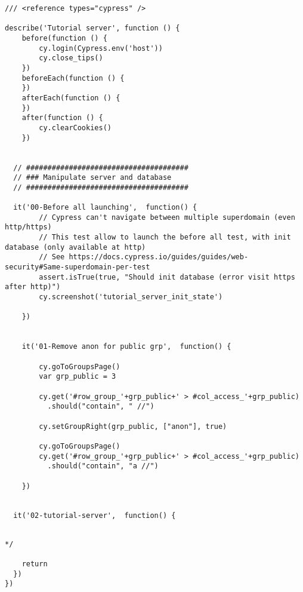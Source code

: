 
\begin{verbatim}
/// <reference types="cypress" />

describe('Tutorial server', function () {
    before(function () {
        cy.login(Cypress.env('host'))
        cy.close_tips()
    })
    beforeEach(function () {
    })
    afterEach(function () {
    })
    after(function () {
        cy.clearCookies()
    })


  // ######################################
  // ### Manipulate server and database
  // ######################################

  it('00-Before all launching',  function() {
        // Cypress can't navigate between multiple superdomain (even http/https)
        // This test allow to launch the before all test, with init database (only available at http)
        // See https://docs.cypress.io/guides/guides/web-security#Same-superdomain-per-test
        assert.isTrue(true, "Should init database (error visit https after http)")
        cy.screenshot('tutorial_server_init_state')

    })


    it('01-Remove anon for public grp',  function() {

        cy.goToGroupsPage()
        var grp_public = 3

        cy.get('#row_group_'+grp_public+' > #col_access_'+grp_public)
          .should("contain", " //")

        cy.setGroupRight(grp_public, ["anon"], true)

        cy.goToGroupsPage()
        cy.get('#row_group_'+grp_public+' > #col_access_'+grp_public)
          .should("contain", "a //")

    })


  it('02-tutorial-server',  function() {


\end{verbatim}



\begin{verbatim}
*/

    return
  })
})

\end{verbatim}
